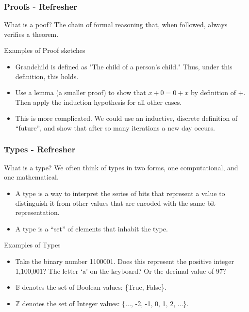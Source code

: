 \documentclass
  [hyperref={colorlinks = true,linkcolor = blue, 
             citecolor = blue, urlcolor = blue}
  ]{beamer}
\begin{document}
\begin{frame}[fragile]
  \frametitle{Proofs - Refresher}
  \begin{block}{What is a poof?}
    The chain of formal reasoning that, when followed, always verifies a
    theorem.
  \end{block}
  \begin{block}{Examples of Proof sketches}
    \begin{itemize}
      \item Grandchild is defined as "The child of a person's child." Thus,
      under this definition, this holds.
      \item Use a lemma (a smaller proof) to show that $x + 0 = 0 + x$ by
      definition of $+$. Then apply the induction hypothesis for all other
      cases.
      \item This is more complicated. We could use an inductive, discrete definition of
      ``future'', and show that after so many iterations a new day occurs.
    \end{itemize}
  \end{block}
\end{frame}



\begin{frame}[fragile]
  \frametitle{Types - Refresher}
  \begin{block}{What is a type?}
  We often think of types in two forms, one computational, and one
  mathematical.
    \begin{itemize}
      \item A type is a way to interpret the series of bits that represent a
      value to distinguish it from other values that are encoded with the same
      bit representation. 
      \item A type is a ``set'' of elements that inhabit the type.
    \end{itemize}
  \end{block}
  \begin{block}{Examples of Types}
    \begin{itemize}
      \item Take the binary number 1100001. Does this represent the positive
      integer 1,100,001? The letter `a' on the keyboard? Or the decimal value
      of 97?
      \item $\mathbb{B}$ denotes the set of Boolean values: \{True, False\}.
      \item $\mathbb{Z}$ denotes the set of Integer values: \{..., -2, -1, 0,
      1, 2, ...\}.
    \end{itemize}
  \end{block}
\end{frame}
\end{document}
